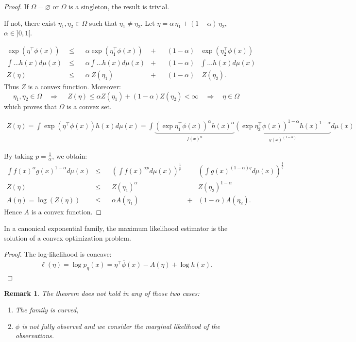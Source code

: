 \documentclass[12pt]{report}
\newtheorem{remark}{Remark}[section]
\begin{document}
\begin{proof}
If $\Omega = \varnothing$ or $\Omega$ is a singleton, the result is trivial.

If not, there exist $ \eta_1,\eta_2 \in \Omega$ such that $\eta_1 \neq \eta_2$. Let $\eta = \alpha \, \eta_1 + (1 - \alpha) \, \eta_2$, \;\; $\alpha \in ]0, 1[$.

\[ \begin{aligned}
\exp(\eta^\top \phi(x)) \: &\leqslant  & &\alpha \exp(\eta_1^\top \phi(x)) &+ &  &(1 - \alpha) & \exp (\eta_2^\top \phi(x))\\
\int \ldots h(x) d\mu(x) \: &\leqslant & &\alpha \int \ldots h(x) d\mu(x) &+ &  &(1 - \alpha) & \int \ldots h(x) d\mu(x)\\
Z(\eta) \: &\leqslant & &\alpha \: Z(\eta_1) &+ & &(1 - \alpha) & \: Z(\eta_2).
\end{aligned} \]
Thus  $Z$ is a convex function. Moreover:
$$\eta_1, \eta_2 \in \Omega \quad \Rightarrow \quad
\ Z(\eta) \leqslant \alpha Z(\eta_1) + (1 - \alpha) Z(\eta_2) < \infty \quad \Rightarrow \quad
\eta \in \Omega$$
which proves that $\Omega$ is a convex set.

\[ \begin{aligned}
Z(\eta) = \int \exp \left( \eta^\top \phi(x) \right) h(x) d\mu(x) = \int \underbrace{(\exp \eta_1^\top \phi(x))^\alpha h(x)^\alpha}_{f(x)^\alpha}   \underbrace{(\exp \eta_2^\top \phi(x))^{1 - \alpha}  h(x)^{1 - \alpha}}_{g(x)^{(1-\alpha)}}   d\mu(x)
\end{aligned} \]

By taking $p = \frac1\alpha$, we obtain:
\[ \begin{aligned}
\int f(x)^\alpha g(x)^{1 - \alpha} d\mu(x) &\leqslant & &\left(\int f(x)^{\alpha p} d\mu(x)\right)^\frac1p  & &\!\!\!\!\!\!\!\!\!\!\left(\int g(x)^{(1 - \alpha) q} d\mu(x)\right)^\frac1q\\
Z(\eta) &\leqslant & &Z(\eta_1) ^\alpha &  &Z(\eta_2)^{1 - \alpha}\\
A(\eta) = \log(Z(\eta)) &\leqslant & &\alpha A(\eta_1) & + &(1 - \alpha) A(\eta_2).
\end{aligned} \]
Hence $A$ is a convex function.
\end{proof}

\begin{corollary}
In a canonical exponential family, the maximum likelihood estimator is the solution of a convex optimization problem.
\end{corollary}
\begin{proof}
The log-likelihood is concave:
\[ \begin{aligned}
\ell(\eta) = \log p_\eta(x) = \eta^\top \bar{\phi}(x) - A(\eta) + \log h(x).
\end{aligned} \]
\end{proof}
\begin{remark}
The theorem does not hold in any of those two cases:
\begin{enumerate}
  \item The family is curved,
  \item $\phi$ is not fully observed and we consider the marginal likelihood of the observations.
\end{enumerate}
\end{remark}
\end{document}
